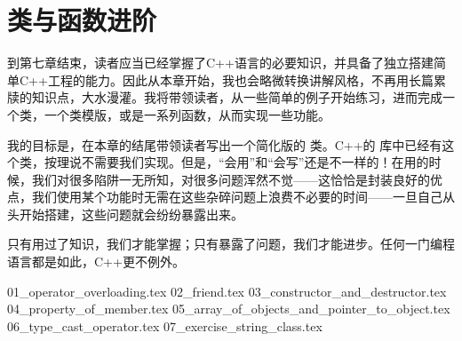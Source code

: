 \chapter{类与函数进阶}
到第七章结束，读者应当已经掌握了C++语言的必要知识，并具备了独立搭建简单C++工程的能力。因此从本章开始，我也会略微转换讲解风格，不再用长篇累牍的知识点，大水漫灌。我将带领读者，从一些简单的例子开始练习，进而完成一个类，一个类模版，或是一系列函数，从而实现一些功能。\par
我的目标是，在本章的结尾带领读者写出一个简化版的 \lstinline@string@ 类。C++的 \lstinline@string@ 库中已经有这个类，按理说不需要我们实现。但是，``会用''和``会写''还是不一样的！在用的时候，我们对很多陷阱一无所知，对很多问题浑然不觉——这恰恰是封装良好的优点，我们使用某个功能时无需在这些杂碎问题上浪费不必要的时间——一旦自己从头开始搭建，这些问题就会纷纷暴露出来。\par
只有用过了知识，我们才能掌握；只有暴露了问题，我们才能进步。任何一门编程语言都是如此，C++更不例外。\par
{01_operator_overloading.tex}
{02_friend.tex}
{03_constructor_and_destructor.tex}
{04_property_of_member.tex}
{05_array_of_objects_and_pointer_to_object.tex}
{06_type_cast_operator.tex}
{07_exercise_string_class.tex}
